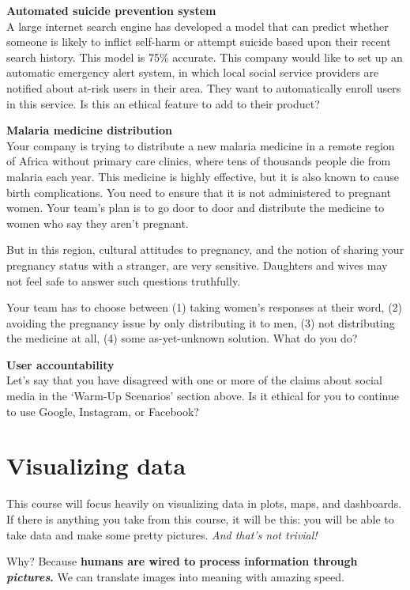 \documentclass[
]{book}
\begin{document}
\textbf{Automated suicide prevention system}\\
A large internet search engine has developed a model that can predict whether someone is likely to inflict self-harm or attempt suicide based upon their recent search history. This model is 75\% accurate. This company would like to set up an automatic emergency alert system, in which local social service providers are notified about at-risk users in their area. They want to automatically enroll users in this service. Is this an ethical feature to add to their product?

\textbf{Malaria medicine distribution}\\
Your company is trying to distribute a new malaria medicine in a remote region of Africa without primary care clinics, where tens of thousands people die from malaria each year. This medicine is highly effective, but it is also known to cause birth complications. You need to ensure that it is not administered to pregnant women. Your team's plan is to go door to door and distribute the medicine to women who say they aren't pregnant.

But in this region, cultural attitudes to pregnancy, and the notion of sharing your pregnancy status with a stranger, are very sensitive. Daughters and wives may not feel safe to answer such questions truthfully.

Your team has to choose between (1) taking women's responses at their word, (2) avoiding the pregnancy issue by only distributing it to men, (3) not distributing the medicine at all, (4) some as-yet-unknown solution. What do you do?

\textbf{User accountability}\\
Let's say that you have disagreed with one or more of the claims about social media in the `Warm-Up Scenarios' section above. Is it ethical for you to continue to use Google, Instagram, or Facebook?

\hypertarget{dataviz}{%
\chapter{Visualizing data}\label{dataviz}}

This course will focus heavily on visualizing data in plots, maps, and dashboards. If there is anything you take from this course, it will be this: you will be able to take data and make some pretty pictures. \emph{And that's not trivial!}

Why? Because \textbf{humans are wired to process information through \emph{pictures}.} We can translate images into meaning with amazing speed.
\end{document}

